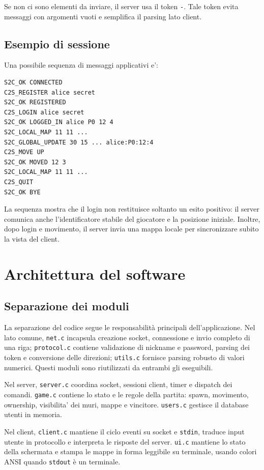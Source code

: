 \documentclass[11pt,a4paper]{article}
\begin{document}
Se non ci sono elementi da inviare, il server usa il token \texttt{-}. Tale
token evita messaggi con argomenti vuoti e semplifica il parsing lato client.

\subsection{Esempio di sessione}

Una possibile sequenza di messaggi applicativi e':

\begin{lstlisting}[style=textstyle]
S2C_OK CONNECTED
C2S_REGISTER alice secret
S2C_OK REGISTERED
C2S_LOGIN alice secret
S2C_OK LOGGED_IN alice P0 12 4
S2C_LOCAL_MAP 11 11 ...
S2C_GLOBAL_UPDATE 30 15 ... alice:P0:12:4
C2S_MOVE UP
S2C_OK MOVED 12 3
S2C_LOCAL_MAP 11 11 ...
C2S_QUIT
S2C_OK BYE
\end{lstlisting}

La sequenza mostra che il login non restituisce soltanto un esito positivo: il
server comunica anche l'identificatore stabile del giocatore e la posizione
iniziale. Inoltre, dopo login e movimento, il server invia una mappa locale per
sincronizzare subito la vista del client.

\section{Architettura del software}

\subsection{Separazione dei moduli}

La separazione del codice segue le responsabilità principali dell'applicazione.
Nel lato comune, \texttt{net.c} incapsula creazione socket, connessione e invio
completo di una riga; \texttt{protocol.c} contiene validazione di nickname e
password, parsing dei token e conversione delle direzioni; \texttt{utils.c}
fornisce parsing robusto di valori numerici. Questi moduli sono riutilizzati da
entrambi gli eseguibili.

Nel server, \texttt{server.c} coordina socket, sessioni client, timer e dispatch
dei comandi. \texttt{game.c} contiene lo stato e le regole della partita:
spawn, movimento, ownership, visibilita' dei muri, mappe e vincitore.
\texttt{users.c} gestisce il database utenti in memoria. 

Nel client, \texttt{client.c} mantiene il ciclo eventi su socket e
\texttt{stdin}, traduce input utente in protocollo e interpreta le risposte del
server. \texttt{ui.c} mantiene lo stato della schermata e stampa le mappe in
forma leggibile su terminale, usando colori ANSI quando \texttt{stdout} è un terminale.
\end{document}
